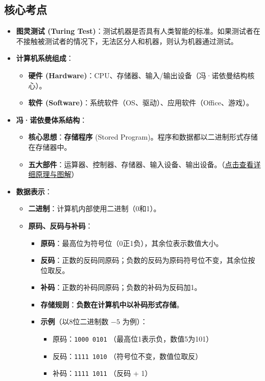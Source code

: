 \documentclass[a4paper,12pt]{article}
\begin{document}
\subsection{核心考点}
\begin{itemize}
    \item \textbf{图灵测试 (Turing Test)}：测试机器是否具有人类智能的标准。如果测试者在不接触被测试者的情况下，无法区分人和机器，则认为机器通过测试。
    \item \textbf{计算机系统组成}：
    \begin{itemize}
        \item \textbf{硬件 (Hardware)}：CPU、存储器、输入/输出设备（冯·诺依曼结构核心）。
        \item \textbf{软件 (Software)}：系统软件（OS、驱动）、应用软件（Office、游戏）。
    \end{itemize}
    \item \textbf{冯·诺依曼体系结构}：
    \begin{itemize}
        \item \textbf{核心思想}：\textbf{存储程序} (Stored Program)。程序和数据都以二进制形式存储在存储器中。
        \item \textbf{五大部件}：运算器、控制器、存储器、输入设备、输出设备。（\hyperref[sec:von_neumann]{点击查看详细原理与图解}）
    \end{itemize}
    \item \textbf{数据表示}：
    \begin{itemize}
        \item \textbf{二进制}：计算机内部使用二进制（0和1）。
        \item \textbf{原码、反码与补码}：
        \begin{itemize}
            \item \textbf{原码}：最高位为符号位（0正1负），其余位表示数值大小。
            \item \textbf{反码}：正数的反码同原码；负数的反码为原码符号位不变，其余位按位取反。
            \item \textbf{补码}：正数的补码同原码；负数的补码为反码加1。
            \item \textbf{存储规则}：\textbf{负数在计算机中以补码形式存储}。
            \item \textbf{示例}（以8位二进制数 $-5$ 为例）：
            \begin{itemize}
                \item 原码：\texttt{1000 0101} （最高位1表示负，数值5为101）
                \item 反码：\texttt{1111 1010} （符号位不变，数值位取反）
                \item 补码：\texttt{1111 1011} （反码 + 1）
            \end{itemize}
        \end{itemize}
    \end{itemize}
\end{itemize}
\end{document}
